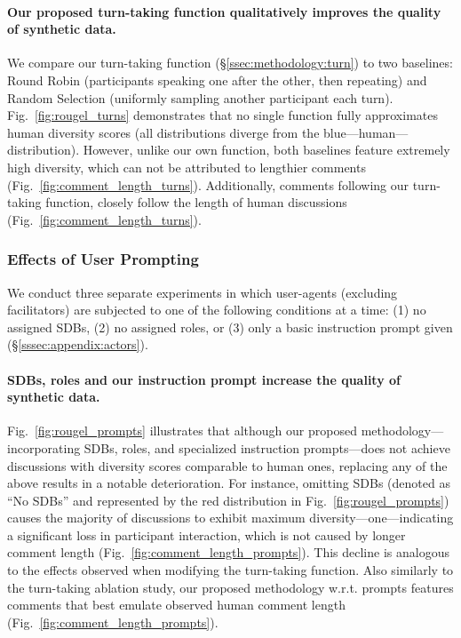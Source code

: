 \paragraph{Our proposed turn-taking function qualitatively improves the quality of synthetic data.} We compare our turn-taking function (\S\ref{ssec:methodology:turn}) to two baselines: Round Robin (participants speaking one after the other, then repeating) and Random Selection (uniformly sampling another participant each turn). Fig.~\ref{fig:rougel_turns} demonstrates that no single function fully approximates human diversity scores (all distributions diverge from the blue—human—distribution). However, unlike our own function, both baselines feature extremely high diversity, which can not be attributed to lengthier comments (Fig.~\ref{fig:comment_length_turns}). Additionally, comments following our turn-taking function, closely follow the length of human discussions (Fig.~\ref{fig:comment_length_turns}).


\subsubsection{Effects of User Prompting}

We conduct three separate experiments in which user-agents (excluding facilitators) are subjected to one of the following conditions at a time: (1) no assigned \acp{SDB}, (2) no assigned roles, or (3) only a basic instruction prompt given (\S\ref{sssec:appendix:actors}). 

\paragraph{\acp{SDB}, roles and our instruction prompt increase the quality of synthetic data.} Fig.~\ref{fig:rougel_prompts} illustrates that although our proposed methodology---incorporating \acp{SDB}, roles, and specialized instruction prompts---does not achieve discussions with diversity scores comparable to human ones, replacing any of the above results in a notable deterioration. For instance, omitting \acp{SDB} (denoted as ``No \acp{SDB}'' and represented by the red distribution in Fig.~\ref{fig:rougel_prompts}) causes the majority of discussions to exhibit maximum diversity---one---indicating a significant loss in participant interaction, which is not caused by longer comment length (Fig.~\ref{fig:comment_length_prompts}). This decline is analogous to the effects observed when modifying the turn-taking function. Also similarly to the turn-taking ablation study, our proposed methodology w.r.t. prompts features comments that best emulate observed human comment length (Fig.~\ref{fig:comment_length_prompts}).